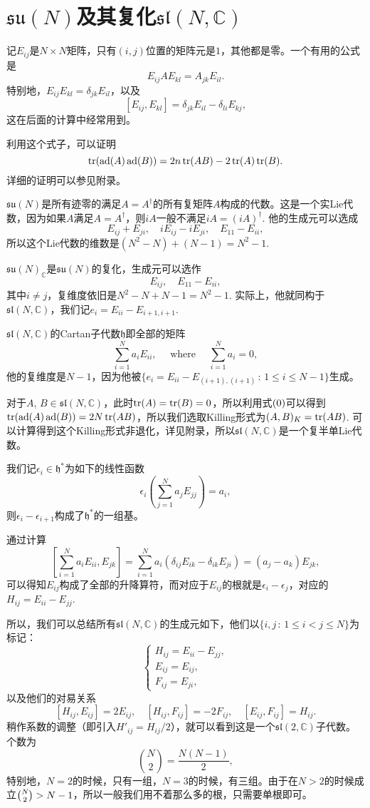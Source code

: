 \documentclass[9pt]{extarticle}
\newcommand{\cc}{\mathbb{C}}
\DeclareMathOperator{\ad}{ad}
\begin{document}
\section{$\mathfrak{su}(N)$及其复化$\mathfrak{sl}(N,\cc)$}

记$E_{ij}$是$N\times N$矩阵，只有$(i,j)$位置的矩阵元是$1$，其他都是零。一个有用的公式是
\[
	E_{ij}AE_{kl}=A_{jk}E_{il}.
\]
特别地，$E_{ij}E_{kl}=\delta_{jk}E_{il}$，以及
\[
	[E_{ij},E_{kl}]=\delta_{jk}E_{il}-\delta_{li}E_{kj},
\]
这在后面的计算中经常用到。

利用这个式子，可以证明
\begin{equation}
	\tr(\ad(A)\ad(B))=2n\tr(AB)-2\tr(A)\tr(B).
\end{equation}
详细的证明可以参见附录。

\para $\mathfrak{su}(N)$是所有迹零的满足$A=A^\dag$的所有复矩阵$A$构成的代数。这是一个实Lie代数，因为如果$A$满足$A=A^\dag$，则$iA$一般不满足$iA=(iA)^\dag$. 他的生成元可以选成
\[
	E_{ij}+E_{ji},\quad iE_{ij}-iE_{ji},\quad E_{11}-E_{ii},
\]
所以这个Lie代数的维数是$(N^2-N)+(N-1)=N^2-1$.

$\mathfrak{su}(N)_\cc$是$\mathfrak{su}(N)$的复化，生成元可以选作
\[
	E_{ij},\quad E_{11}-E_{ii},
\]
其中$i\neq j$，复维度依旧是$N^2-N+N-1=N^2-1$. 实际上，他就同构于$\mathfrak{sl}(N,\cc)$，我们记$e_i=E_{ii}-E_{i+1,i+1}$.

$\mathfrak{sl}(N,\cc)$的Cartan子代数$\mathfrak{h}$即全部的矩阵
\[
	\sum_{i=1}^N a_i E_{ii}, \quad \text{ where } \quad \sum_{i=1}^N  a_i=0,
\]
他的复维度是$N-1$，因为他被$\{e_i=E_{ii}-E_{(i+1),(i+1)}\,:\, 1\leq i \leq N-1\}$生成。

\para 对于$A$, $B\in \mathfrak{sl}(N,\cc)$，此时$\operatorname{tr}(A)=\operatorname{tr}(B)=0$，所以利用式$(\theequation)$可以得到$\tr(\ad (A)\ad(B))=2N\tr(AB)$，所以我们选取Killing形式为$(A,B)_K=\operatorname{tr}(AB)$. 可以计算得到这个Killing形式非退化，详见附录，所以$\mathfrak{sl}(N,\cc)$是一个复半单Lie代数。

\para 我们记$\epsilon_i \in \mathfrak{h}^*$为如下的线性函数
\[
	 \epsilon_i\left(\sum_{j=1}^N a_j E_{jj}\right)=a_i,
\]
则$\epsilon_i-\epsilon_{i+1}$构成了$\mathfrak{h}^*$的一组基。

通过计算
\[
	\left [\sum_{i=1}^N a_i E_{ii},E_{jk}\right ]=\sum_{i=1}^N  a_i(\delta_{ij}E_{ik}-\delta_{ik}E_{ji})=(a_j-a_k)E_{jk},
\]
可以得知$E_{ij}$构成了全部的升降算符，而对应于$E_{ij}$的根就是$\epsilon_i-\epsilon_j$，对应的$H_{ij}=E_{i i}-E_{j j}$.

所以，我们可以总结所有$\mathfrak{sl}(N,\cc)$的生成元如下，他们以$\{i,j\,:\,1\leq i< j\leq N\}$为标记：
\[
	\begin{cases}
		H_{ij}=E_{ii}-E_{jj},\\
		E_{ij}=E_{ij},\\
		F_{ij}=E_{ji},
	\end{cases}
\]
以及他们的对易关系
\[
	[H_{ij},E_{ij}]=2 E_{ij},\quad [H_{ij},F_{ij}]=-2 F_{ij},\quad [E_{ij},F_{ij}]=H_{ij}.
\]
稍作系数的调整（即引入$H'_{ij}=H_{ij}/2$），就可以看到这是一个$\mathfrak{sl}(2,\cc)$子代数。个数为
\[
\binom{N}{2}=\frac{N(N-1)}{2},
\]
特别地，$N=2$的时候，只有一组，$N=3$的时候，有三组。由于在$N> 2$的时候成立$\tbinom{N}{2}>N-1$，所以一般我们用不着那么多的根，只需要单根即可。
\end{document}
